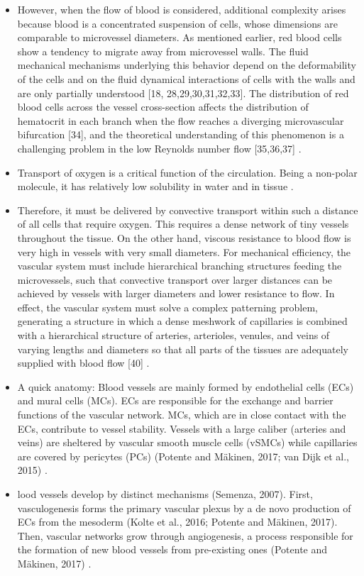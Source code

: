 \begin{itemize}
	 \item However, when the flow of blood is considered, additional complexity arises because blood is a concentrated suspension of cells, whose dimensions are comparable to microvessel diameters. As mentioned earlier, red blood cells show a tendency to migrate away from microvessel walls. The fluid mechanical mechanisms underlying this behavior depend on the deformability of the cells and on the fluid dynamical interactions of cells with the walls and are only partially understood [18, 28,29,30,31,32,33]. The distribution of red blood cells across the vessel cross-section affects the distribution of hematocrit in each branch when the flow reaches a diverging microvascular bifurcation [34], and the theoretical understanding of this phenomenon is a challenging problem in the low Reynolds number flow [35,36,37] \cite{Secomb2021}.
	 \item Transport of oxygen is a critical function of the circulation. Being a non-polar molecule, it has relatively low solubility in water and in tissue \cite{Secomb2021}.
	 \item Therefore, it must be delivered by convective transport within such a distance of all cells that require oxygen. This requires a dense network of tiny vessels throughout the tissue. On the other hand, viscous resistance to blood flow is very high in vessels with very small diameters. For mechanical efficiency, the vascular system must include hierarchical branching structures feeding the microvessels, such that convective transport over larger distances can be achieved by vessels with larger diameters and lower resistance to flow. In effect, the vascular system must solve a complex patterning problem, generating a structure in which a dense meshwork of capillaries is combined with a hierarchical structure of arteries, arterioles, venules, and veins of varying lengths and diameters so that all parts of the tissues are adequately supplied with blood flow [40] \cite{Secomb2021}.
	 \item A quick anatomy: Blood vessels are mainly formed by endothelial cells (ECs) and mural cells (MCs). ECs are responsible for the exchange and barrier functions of the vascular network. MCs, which are in close contact with the ECs, contribute to vessel stability. Vessels with a large caliber (arteries and veins) are sheltered by vascular smooth muscle cells (vSMCs) while capillaries are covered by pericytes (PCs) (Potente and Mäkinen, 2017; van Dijk et al., 2015) \cite{Ouarne2021}.
	 \item lood vessels develop by distinct mechanisms (Semenza, 2007). First, vasculogenesis forms the primary vascular plexus by a de novo production of ECs from the mesoderm (Kolte et al., 2016; Potente and Mäkinen, 2017). Then, vascular networks grow through angiogenesis, a process responsible for the formation of new blood vessels from pre-existing ones (Potente and Mäkinen, 2017) \cite{Ouarne2021}.

\end{itemize}
